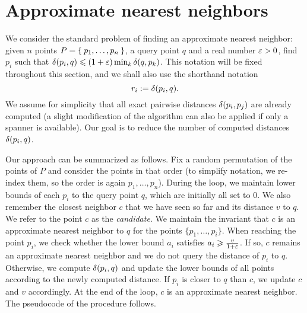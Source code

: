 \documentclass[a4paper,UKenglish,cleveref, autoref]{lipics-v2019}
\begin{document}
\section{Approximate nearest neighbors}
\label{sec:ann}
We consider the standard problem of finding an approximate nearest neighbor: given
$n$ points $P = \Set{p_1, \dots, p_n}$, a query point $q$ and a real number $\varepsilon > 0$,
find $p_i$ such that $\delta(p_i, q) \leqslant (1 + \varepsilon) \min_{k} \delta(q, p_k)$. This notation will be fixed throughout this 
section, and we shall also use the shorthand notation
\[
    r_i := \delta(p_i, q).
\]
We assume for simplicity
that all exact pairwise distances $\delta(p_i, p_j)$ are already computed
(a slight modification of the algorithm can also be applied if only a spanner is available).
Our goal is to reduce the number of computed distances $\delta(p_i, q)$. 

Our approach can be summarized as follows. 
Fix a random permutation of the points of $P$ 
and consider the points in that order 
(to simplify notation,
we re-index them, so the order is again $p_1, \dots, p_n$).
During the loop, we maintain lower bounds of each $p_i$
to the query point $q$, which are initially all set to $0$.
We also remember the closest neighbor $c$ that we have seen so
far and its distance $v$ to $q$.
We refer to the point $c$ as the \emph{candidate}.
We maintain the invariant that $c$ is an approximate nearest neighbor
to $q$ for the points $\{p_1,\ldots,p_i\}$.
When reaching the point $p_i$, we check whether the lower
bound $a_i$ satisfies $a_i\geqslant \frac{v}{1+\varepsilon}$.
If so, $c$ remains an approximate nearest neighbor and
we do not query the distance of $p_i$ to $q$.
Otherwise, we compute $\delta(p_i,q)$ and update the lower bounds
of all points according to the newly computed distance.
If $p_i$ is closer to $q$ than $c$, we update $c$ and $v$
accordingly. At the end of the loop, $c$ is an approximate nearest
neighbor. The pseudocode of the procedure follows.


\begin{algorithmic}
\label{alg:ann_blind}

    \State {}
        \Else
            \State {}
            \EndIf
        \EndIf
    \EndFor
    \State {}
\EndFunction
\end{algorithmic}
\end{document}
